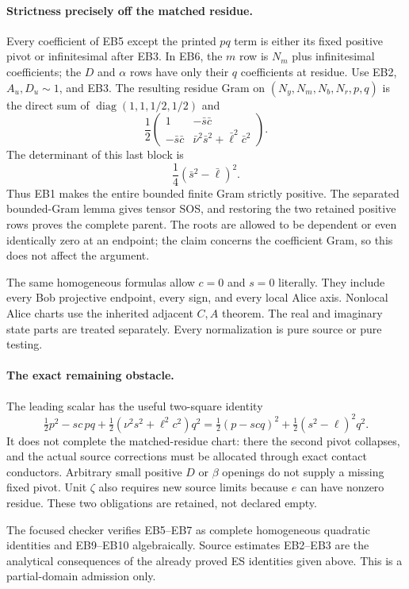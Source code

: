 \paragraph{Strictness precisely off the matched residue.}
Every coefficient of EB5 except the printed $pq$ term is either
its fixed positive pivot or infinitesimal after EB3. In EB6, the
$m$ row is $N_m$ plus infinitesimal coefficients; the $D$ and
$\alpha$ rows have only their $q$ coefficients at residue.
Use EB2, $A_u,D_u\sim1$, and EB3. The resulting residue Gram on
$(N_y,N_m,N_b,N_r,p,q)$ is the direct sum of
$\operatorname{diag}(1,1,1/2,1/2)$ and
\[
 \frac12
 \begin{pmatrix}
 1&-\bar s\bar c\\
 -\bar s\bar c&\bar\nu^2\bar s^2+\bar\ell^2\bar c^2
 \end{pmatrix}.                                                \tag{EB8}
\]
The determinant of this last block is
\[
             \frac14(\bar s^2-\bar\ell)^2.                    \tag{EB9}
\]
Thus EB1 makes the entire bounded finite Gram strictly positive.
The separated bounded-Gram lemma gives tensor SOS, and restoring the
two retained positive rows proves the complete parent. The roots are
allowed to be dependent or even identically zero at an endpoint; the
claim concerns the coefficient Gram, so this does not affect the
argument.

The same homogeneous formulas allow $c=0$ and $s=0$ literally.
They include every Bob projective endpoint, every sign, and every
local Alice axis. Nonlocal Alice charts use the inherited adjacent
$C,A$ theorem. The real and imaginary state parts are treated
separately. Every normalization is pure source or pure testing.

\paragraph{The exact remaining obstacle.}
The leading scalar has the useful two-square identity
\[
 \tfrac12p^2-sc\,pq
 +\tfrac12(\nu^2s^2+\ell^2c^2)q^2
 =\tfrac12(p-scq)^2+\tfrac12(s^2-\ell)^2q^2.                  \tag{EB10}
\]
It does not complete the matched-residue chart: there the second
pivot collapses, and the actual source corrections must be allocated
through exact contact conductors. Arbitrary small positive $D$ or
$\beta$ openings do not supply a missing fixed pivot. Unit $\zeta$
also requires new source limits because $e$ can have nonzero residue.
These two obligations are retained, not declared empty.

The focused checker verifies EB5--EB7 as complete homogeneous
quadratic identities and EB9--EB10 algebraically. Source estimates
EB2--EB3 are the analytical consequences of the already proved
ES identities given above. This is a partial-domain admission only.
